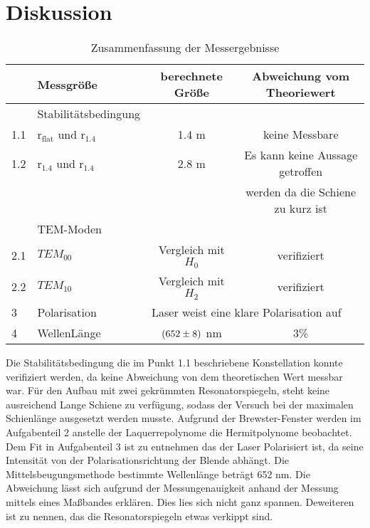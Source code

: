 \section{Diskussion}
\label{sec:Diskussion}

\begin{table}
  \centering
  \begin{tabular}{l|l | c c}
    \toprule
	&Messgröße	& berechnete Größe	& Abweichung vom Theoriewert \\
    \midrule
	& Stabilitätsbedingung \\
	1.1& \rightarrow $\text{r}_\text{flat}$ und $\text{r}_\text{1.4}$ & 1.4 m & keine Messbare\\
	1.2& \rightarrow $\text{r}_\text{1.4}$ und $\text{r}_\text{1.4}$ & 2.8 m& Es kann keine Aussage getroffen \\
	& & &werden da die Schiene zu kurz ist \\
	& TEM-Moden\\
	2.1& \rightarrow $TEM_{00}$ & Vergleich mit $H_0$ & verifiziert \\
	2.2& \rightarrow $TEM_{10}$ & Vergleich mit $H_2$ & verifiziert \\
	3& Polarisation& \multicolumn{2}{l}{Laser weist eine klare Polarisation auf} \\
	4& WellenLänge & $(\num{652 +-8})$ nm & 3\% \\
    \bottomrule
  \end{tabular}
  \caption{Zusammenfassung der Messergebnisse}
  \label{tab:Mess}
\end{table}

Die Stabilitätsbedingung die im Punkt 1.1 beschriebene Konstellation konnte verifiziert werden, da keine Abweichung von dem theoretischen Wert messbar war. Für den Aufbau mit zwei gekrümmten Resonatorspiegeln, steht keine ausreichend Lange Schiene zu verfügung, sodass der Versuch bei der maximalen Schienlänge ausgesetzt werden musste. Aufgrund der Brewster-Fenster werden im Aufgabenteil 2 anstelle der Laquerrepolynome die Hermitpolynome beobachtet. Dem Fit in Aufgabenteil 3 ist zu entnehmen das der Laser Polarisiert ist, da seine Intensität von der Polarisationsrichtung der Blende abhängt. Die Mittelsbeugungsmethode bestimmte Wellenlänge beträgt 652 nm. Die Abweichung lässt sich aufgrund der Messungenauigkeit anhand der Messung mittels eines Maßbandes erklären. Dies lies sich nicht ganz spannen. Deweiteren ist zu nennen, das die Resonatorspiegeln etwas verkippt sind.  
